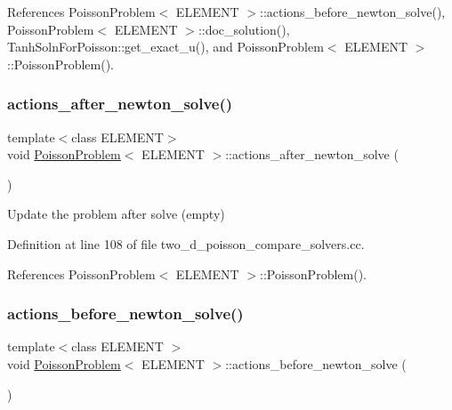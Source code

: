 References Poisson\+Problem$<$ E\+L\+E\+M\+E\+N\+T $>$\+::actions\+\_\+before\+\_\+newton\+\_\+solve(), Poisson\+Problem$<$ E\+L\+E\+M\+E\+N\+T $>$\+::doc\+\_\+solution(), Tanh\+Soln\+For\+Poisson\+::get\+\_\+exact\+\_\+u(), and Poisson\+Problem$<$ E\+L\+E\+M\+E\+N\+T $>$\+::\+Poisson\+Problem().

\mbox{\label{classPoissonProblem_a7a9478d8e1e5c7d3a886b00ab7d50bbd}} 
\subsubsection{\texorpdfstring{actions\+\_\+after\+\_\+newton\+\_\+solve()}{actions\_after\_newton\_solve()}\hspace{0.1cm}{\footnotesize\ttfamily [3/3]}}
{\footnotesize\ttfamily template$<$class E\+L\+E\+M\+E\+NT$>$ \\
void \hyperlink{classPoissonProblem}{Poisson\+Problem}$<$ E\+L\+E\+M\+E\+NT $>$\+::actions\+\_\+after\+\_\+newton\+\_\+solve (\begin{DoxyParamCaption}{ }\end{DoxyParamCaption})\hspace{0.3cm}{\ttfamily [inline]}}



Update the problem after solve (empty) 



Definition at line 108 of file two\+\_\+d\+\_\+poisson\+\_\+compare\+\_\+solvers.\+cc.



References Poisson\+Problem$<$ E\+L\+E\+M\+E\+N\+T $>$\+::\+Poisson\+Problem().

\mbox{\label{classPoissonProblem_a398608a5ff73b74c5a387b3f794c58df}} 
\subsubsection{\texorpdfstring{actions\+\_\+before\+\_\+newton\+\_\+solve()}{actions\_before\_newton\_solve()}\hspace{0.1cm}{\footnotesize\ttfamily [1/3]}}
{\footnotesize\ttfamily template$<$class E\+L\+E\+M\+E\+NT $>$ \\
void \hyperlink{classPoissonProblem}{Poisson\+Problem}$<$ E\+L\+E\+M\+E\+NT $>$\+::actions\+\_\+before\+\_\+newton\+\_\+solve (\begin{DoxyParamCaption}{ }\end{DoxyParamCaption})}



